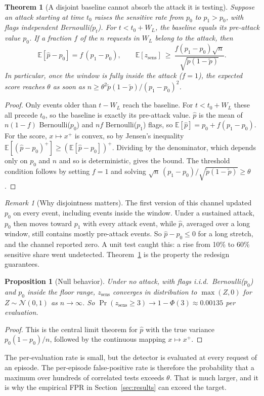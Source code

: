 \documentclass[conference]{IEEEtran}
\newtheorem{theorem}{Theorem}
\newtheorem{proposition}{Proposition}
\theoremstyle{remark}
\newtheorem{remark}{Remark}
\begin{document}
\begin{theorem}[A disjoint baseline cannot absorb the attack it is testing]\label{thm:disjoint}
Suppose an attack starting at time $t_0$ raises the sensitive rate from $p_0$ to $p_1>p_0$, with flags independent Bernoulli($p_t$). For $t<t_0+W_L$, the baseline equals its pre-attack value $p_0$. If a fraction $f$ of the $n$ requests in $W_L$ belong to the attack, then
\begin{equation}
\mathbb E[\hat p-p_0]=f\,(p_1-p_0),\qquad \mathbb E[z_{\mathrm{sens}}]\ \ge\ \frac{f(p_1-p_0)\sqrt n}{\sqrt{\tilde p(1-\tilde p)}}.
\end{equation}
In particular, once the window is fully inside the attack ($f=1$), the expected score reaches $\theta$ as soon as $n\ge\theta^2\tilde p(1-\tilde p)/(p_1-p_0)^2$.
\end{theorem}
\begin{proof}
Only events older than $t-W_L$ reach the baseline. For $t<t_0+W_L$ these all precede $t_0$, so the baseline is exactly its pre-attack value. $\hat p$ is the mean of $n(1-f)$ Bernoulli($p_0$) and $nf$ Bernoulli($p_1$) flags, so $\mathbb E[\hat p]=p_0+f(p_1-p_0)$. For the score, $x\mapsto x^+$ is convex, so by Jensen's inequality $\mathbb E[(\hat p-p_0)^+]\ge(\mathbb E[\hat p-p_0])^+$. Dividing by the denominator, which depends only on $p_0$ and $n$ and so is deterministic, gives the bound. The threshold condition follows by setting $f=1$ and solving $\sqrt n\,(p_1-p_0)/\sqrt{\tilde p(1-\tilde p)}\ge\theta$.
\end{proof}

\begin{remark}[Why disjointness matters]
The first version of this channel updated $p_0$ on every event, including events inside the window. Under a sustained attack, $p_0$ then moves toward $p_1$ with every attack event, while $\hat p$, averaged over a long window, still contains mostly pre-attack events. So $\hat p-p_0\le0$ for a long stretch, and the channel reported zero. A unit test caught this: a rise from 10\% to 60\% sensitive share went undetected. Theorem~\ref{thm:disjoint} is the property the redesign guarantees.
\end{remark}

\begin{proposition}[Null behavior]
Under no attack, with flags i.i.d.\ Bernoulli($p_0$) and $p_0$ inside the floor range, $z_{\mathrm{sens}}$ converges in distribution to $\max(Z,0)$ for $Z\sim\mathcal N(0,1)$ as $n\to\infty$. So $\Pr(z_{\mathrm{sens}}\ge3)\to1-\Phi(3)\approx0.00135$ per evaluation.
\end{proposition}
\begin{proof}
This is the central limit theorem for $\hat p$ with the true variance $p_0(1-p_0)/n$, followed by the continuous mapping $x\mapsto x^+$.
\end{proof}
The per-evaluation rate is small, but the detector is evaluated at every request of an episode. The per-episode false-positive rate is therefore the probability that a maximum over hundreds of correlated tests exceeds $\theta$. That is much larger, and it is why the empirical FPR in Section~\ref{sec:results} can exceed the target.
\end{document}
